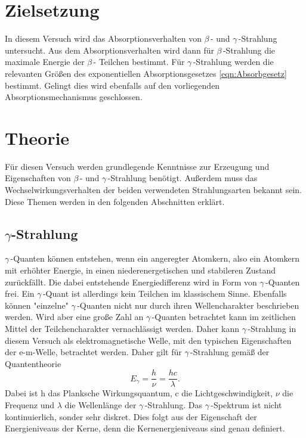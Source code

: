 \section{Zielsetzung}
\label{sec:Ziel}
In diesem Versuch wird das Absorptionsverhalten von $\beta$\,- und $\gamma$\,-Strahlung untersucht. Aus dem Absorptionsverhalten wird dann für $\beta$\,-Strahlung die 
maximale Energie der $\beta$\,- Teilchen bestimmt. Für $\gamma$\,-Strahlung werden die relevanten Größen des exponentiellen Absorptionsgesetzes \ref{eqn:Absorbgesetz} bestimmt.
Gelingt dies wird ebenfalls auf den vorliegenden Absorptionsmechanismus geschlossen.

\section{Theorie}
\label{sec:Theorie}
Für diesen Versuch werden grundlegende Kenntnisse zur Erzeugung und Eigenschaften von $\beta$\,- und $\gamma$\,-Strahlung benötigt. Außerdem muss das Wechselwirkungsverhalten der
beiden verwendeten Strahlungsarten bekannt sein. Diese Themen werden in den folgenden Abschnitten erklärt.

\subsection{\texorpdfstring{$\gamma$-Strahlung}{Gamma-Strahlung}}
\label{subec:Gammastrahlung}
$\gamma$\,-Quanten können entstehen, wenn ein angeregter Atomkern, also ein Atomkern mit erhöhter Energie, in einen niederenergetischen und stabileren Zustand zurückfällt. Die 
dabei entstehende Energiedifferenz wird in Form von $\gamma$\,-Quanten frei. Ein $\gamma$\,-Quant ist allerdings kein Teilchen im klassischem Sinne. Ebenfalls können "einzelne"
$\gamma$\,-Quanten nicht nur durch ihren Wellencharakter beschrieben werden. Wird aber eine große Zahl an $\gamma$\,-Quanten betrachtet kann im zeitlichen Mittel der 
Teilchencharakter vernachlässigt werden. Daher kann $\gamma$\,-Strahlung in diesem Versuch als elektromagnetische Welle, mit den typischen Eigenschaften der e-m-Welle,
betrachtet werden. Daher gilt für $\gamma$\,-Strahlung gemäß der Quantentheorie 
\begin{equation*}
    E_{\gamma} = \frac{h}{\nu} = \frac{hc}{\lambda}.
\end{equation*}
Dabei ist h das Planksche Wirkungsquantum, c die Lichtgeschwindigkeit, $\nu$ die Frequenz und $\lambda$ die Wellenlänge der $\gamma$\,-Strahlung. Das $\gamma$\,-Spektrum ist 
nicht kontinuierlich, sonder sehr diskret. Dies folgt aus der Eigenschaft der Energieniveaus der Kerne, denn die Kernenergieniveaus sind genau definiert.

